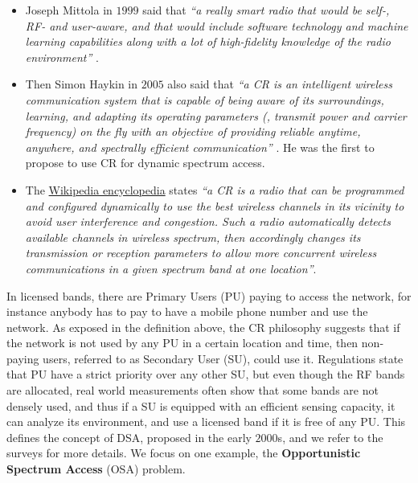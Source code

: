 \begin{itemize}
    \item
    Joseph Mittola in $1999$ said that
    \emph{``a really smart radio that would be self-, RF- and user-aware, and that would include software technology and machine learning capabilities along with a lot of high-fidelity knowledge of the radio environment''} \cite{Mitola99}.

    \item
    Then Simon Haykin in $2005$ also said that
    \emph{``a CR is an intelligent wireless communication system that is capable of being aware of its surroundings, learning, and adapting its operating parameters (\eg, transmit power and carrier frequency) on the fly with an objective of providing reliable anytime, anywhere, and spectrally efficient communication''} \cite{Haykin05}.
    He was the first to propose to use CR for dynamic spectrum access.

    \item
    The \href{https://en.wikipedia.org/wiki/Cognitive_radio}{Wikipedia encyclopedia} states
    \emph{``a CR is a radio that can be programmed and configured dynamically to use the best wireless channels in its vicinity to avoid user interference and congestion. Such a radio automatically detects available channels in wireless spectrum, then accordingly changes its transmission or reception parameters to allow more concurrent wireless communications in a given spectrum band at one location''}.
\end{itemize}


In licensed bands, there are Primary Users (PU) paying to access the network, for instance anybody has to pay to have a mobile phone number and use the network.
As exposed in the definition above, the CR philosophy suggests that if the network is not used by any PU in a certain location and time, then non-paying users, referred to as Secondary User (SU), could use it.
Regulations state that PU have a strict priority over any other SU,
but even though the RF bands are allocated, real world measurements often show that some bands are not densely used, and thus if a SU is equipped with an efficient sensing capacity, it can analyze its environment, and use a licensed band if it is free of any PU.
This defines the concept of DSA, proposed in the early $2000$s, and we refer to the surveys \cite{akyildiz2006next,Zhao07,garhwal2012survey} for more details.
We focus on one example, the \textbf{Opportunistic Spectrum Access} (OSA) problem.


